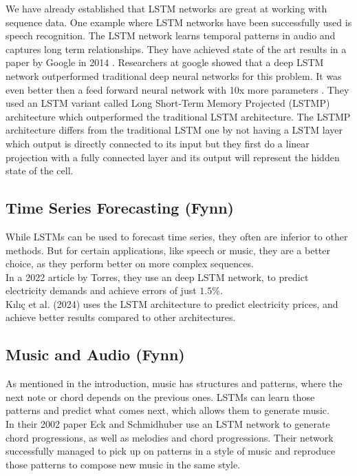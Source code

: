 \documentclass[twoside,a4paper,10pt,DIV=12,BCOR=12mm]{scrartcl}
\begin{document}
We have already established that LSTM networks are great at working with sequence data. One example where LSTM networks
have been successfully used is speech recognition. The LSTM network learns temporal patterns in audio and captures long 
term relationships. They have achieved state of the art results in a paper by Google in 2014 \cite{sak2014longshorttermmemorybased}.
Researchers at google showed that a deep LSTM network outperformed traditional deep neural networks for this problem.
It was even better then a feed forward neural network with 10x more parameters \cite[1]{sak2014longshorttermmemorybased}.
They used an LSTM variant called Long Short-Term Memory Projected (LSTMP) architecture \cite[2]{sak2014longshorttermmemorybased} which 
outperformed the traditional LSTM architecture. The LSTMP architecture differs from the traditional LSTM one by not having a LSTM layer
which output is directly connected to its input but they first do a linear projection with a fully connected layer and its output will represent the 
hidden state of the cell.

\subsection{Time Series Forecasting (Fynn)}
While LSTMs can be used to forecast time series, they often are inferior to other methods.\cite{gers2001timeseries} But for certain applications, like speech or music, they are a better choice, as they perform better on more complex sequences.\cite{gers2001timeseries, cahuantzi2023lstmvsgru}\\
In a 2022 article by Torres, they use an deep LSTM network, to predict electricity demands and achieve errors of just \begin{math}1.5\%\end{math}.\cite{torres2022elctricityforecasting}\\
Kılıç et al. (2024) uses the LSTM architecture to predict electricity prices, and achieve better results compared to other architectures.\cite{nielsen2024electricitypriceforcasting}

\subsection{Music and Audio (Fynn)}
As mentioned in the introduction, music has structures and patterns, where the next note or chord depends on the previous ones. LSTMs can learn those patterns and predict what comes next, which allows them to generate music.\cite{eck2002musicgeneration}\\
In their 2002 paper Eck and Schmidhuber use an LSTM network to generate chord progressions, as well as melodies and chord progressions. Their network successfully managed to pick up on patterns in a style of music and reproduce those patterns to compose new music in the same style.\cite{eck2002musicgeneration}  
\end{document}
